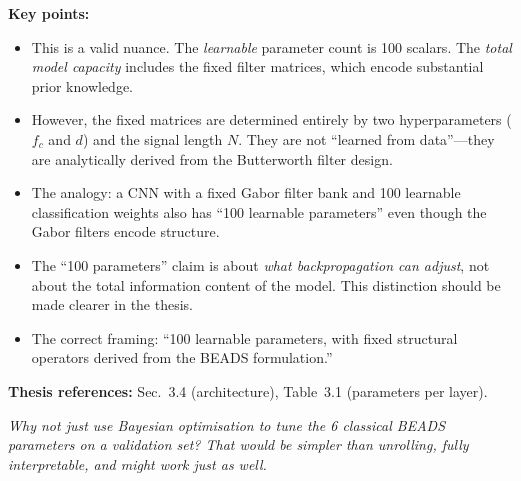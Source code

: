 \documentclass[11pt, letterpaper]{article}
\newcounter{qcounter}
\newcommand{\question}[1]{%
  \stepcounter{qcounter}%
  \begin{questionbox}[Q\theqcounter]%
    \itshape #1%
  \end{questionbox}%
}
\begin{document}
\begin{answerbox}
\textbf{Key points:}
\begin{itemize}[nosep]
  \item This is a valid nuance.  The \emph{learnable} parameter
        count is 100 scalars.  The \emph{total model capacity}
        includes the fixed filter matrices, which encode substantial
        prior knowledge.
  \item However, the fixed matrices are determined entirely by two
        hyperparameters ($f_c$ and $d$) and the signal length $N$.
        They are not ``learned from data''---they are analytically
        derived from the Butterworth filter design.
  \item The analogy: a CNN with a fixed Gabor filter bank and 100
        learnable classification weights also has ``100 learnable
        parameters'' even though the Gabor filters encode structure.
  \item The ``100 parameters'' claim is about \emph{what backpropagation
        can adjust}, not about the total information content of the
        model.  This distinction should be made clearer in the thesis.
  \item The correct framing: ``100 learnable parameters, with
        fixed structural operators derived from the BEADS
        formulation.''
\end{itemize}
\textbf{Thesis references:} Sec.~3.4 (architecture), Table~3.1 (parameters per layer).
\end{answerbox}

\question{Why not just use Bayesian optimisation to tune the 6 classical
BEADS parameters on a validation set?  That would be simpler than
unrolling, fully interpretable, and might work just as well.}
\end{document}
